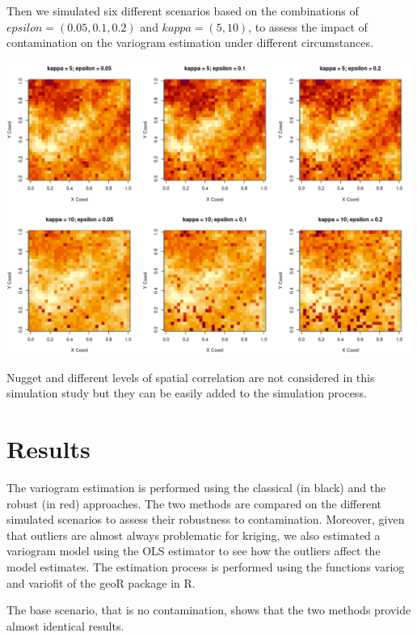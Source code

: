 \documentclass[
  12pt]{article}
\begin{document}
Then we simulated six different scenarios based on the combinations of
\(epsilon = (0.05, 0.1, 0.2)\) and \(kappa = (5, 10)\), to assess the
impact of contamination on the variogram estimation under different
circumstances.

\begin{center}
\includegraphics[width=5.20833in,height=\textheight]{img/cgrf.png}
\end{center}

Nugget and different levels of spatial correlation are not considered in
this simulation study but they can be easily added to the simulation
process.

\section{Results}\label{results}

The variogram estimation is performed using the classical (in black) and
the robust (in red) approaches. The two methods are compared on the
different simulated scenarios to assess their robustness to
contamination. Moreover, given that outliers are almost always
problematic for kriging, we also estimated a variogram model using the
OLS estimator to see how the outliers affect the model estimates. The
estimation process is performed using the functions variog and variofit
of the geoR package in R.

The base scenario, that is no contamination, shows that the two methods
provide almost identical results.
\end{document}
